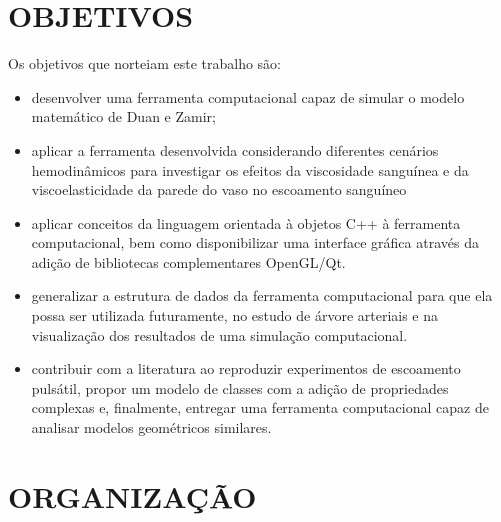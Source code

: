 \documentclass[a4paper,12pt]{monografia}
\theoremstyle{plain}
\theoremstyle{definition}
\theoremstyle{remark}
\begin{document}
\section{OBJETIVOS}\label{sec:obj}

Os objetivos que norteiam este trabalho são:
\begin{itemize}
	\item desenvolver uma ferramenta computacional capaz de simular o modelo matemático de Duan e Zamir;
	\item aplicar a ferramenta desenvolvida considerando diferentes cenários hemodinâmicos para investigar os efeitos da viscosidade sanguínea e da viscoelasticidade da parede do vaso no escoamento sanguíneo
	\item aplicar conceitos da linguagem orientada à objetos C++ à ferramenta computacional, bem como disponibilizar uma interface gráfica através da adição de bibliotecas complementares OpenGL/Qt.
	\item generalizar a estrutura de dados da ferramenta computacional para que ela possa ser utilizada futuramente, no estudo de árvore arteriais e na visualização dos resultados de uma simulação computacional.
	\item contribuir com a literatura ao reproduzir experimentos de escoamento pulsátil, propor um modelo de classes com a adição de propriedades complexas e, finalmente, entregar uma ferramenta computacional capaz de analisar modelos geométricos similares.
\end{itemize}

\section{ORGANIZAÇÃO}\label{sec:org}
\end{document}

